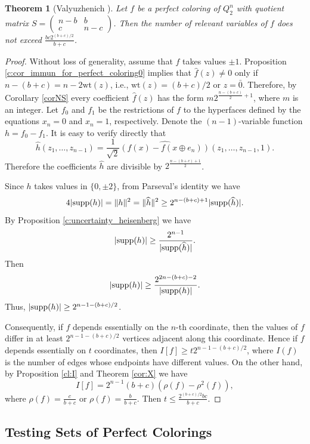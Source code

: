 \documentclass[11pt]{article}
\newtheorem{theorem}{Theorem}[section]
\theoremstyle{definition}
\newcommand{\supp}{{\rm supp}}
\begin{document}
{{{\begin{theorem}[Valyuzhenich \cite{Val26}]
 Let $f$ be a perfect coloring of  $Q^n_2$ with quotient matrix $S=\begin{pmatrix}
    n-b & b\\
    c & n-c
    \end{pmatrix}$. Then the number of relevant variables of $f$
    does not exceed $\frac{bc2^{(b+c)/2}}{b+c}$.
\end{theorem}
\begin{proof}
Without loss of generality, assume that $f$ takes values $\pm 1$.  Proposition \ref{c:cor_immun_for_perfect_coloring0} implies that $\widehat{f}(z)\neq 0$ only if $n-(b+c)=n-2\mathrm{wt}(z)$, i.e., $\mathrm{wt}(z)=(b+c)/2$ or $z=\bar 0$. Therefore, by Corollary \ref{corNS} every coefficient $\widehat{f}(z)$ has the form $m2^{\frac{n-(b+c)}{2}+1}$, where $m$ is an integer. Let $f_0$ and $f_1$ be the restrictions of $f$ to the hyperfaces defined by the equations $x_n=0$ and $x_n=1$, respectively. Denote the $(n-1)$-variable function $h=f_0 - f_1$. It is easy to verify directly that
$$\widehat{h}(z_1,\dots,z_{n-1})=\frac{1}{\sqrt{2}}\widehat{(f(x)  - f(x\oplus e_n))}(z_1,\dots,z_{n-1},1).$$
Therefore the coefficients $\widehat{h}$ are divisible by $2^{\frac{n-(b+c)+1}{2}}$.

 Since $h$ takes values  in $\{0, \pm 2\}$, from Parseval's identity we have
$$4|\supp(h)|=\|h\|^2=\|\widehat{h}\|^2\geq 2^{n-(b+c)+1}|\supp(\widehat{h})|.$$
By Proposition \ref{c:uncertainty_heisenberg} we have
$$|\supp(h)|\geq \frac{2^{n-1}}{|\supp(\widehat{h})|}.$$
Then 
$$|\supp(h)|\geq\frac{2^{2n-(b+c)-2}}{|\supp(h)|}.$$
Thus, $|\supp(h)|\geq 2^{n-1-(b+c)/2}$.


Consequently, if $f$ depends essentially on the $n$-th coordinate, then the values of $f$ differ in at least $2^{n-1-(b+c)/2}$ vertices adjacent along this coordinate. Hence if $f$ depends essentially on $t$ coordinates, then  $I[f]\geq t2^{n-1-(b+c)/2}$, where $I(f)$ is  the number of edges whose endpoints have different values. On the other hand, by Proposition \ref{cl:I} and Theorem \ref{cor:X} we have
$$I[f]= 2^{n-1}(b+c)(\rho(f)-\rho^2(f)),$$
where $\rho(f)=\frac{c}{b+c}$ or $\rho(f)=\frac{b}{b+c}$. Then $t\leq \frac{2^{(b+c)/2}bc}{b+c}$.
\end{proof}

\subsection{Testing Sets of Perfect Colorings}\label{secTest}


}}}
\end{document}

